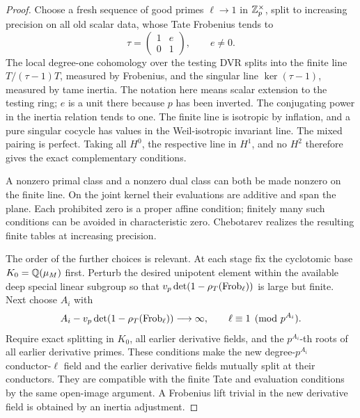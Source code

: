 \begin{proof}
Choose a fresh sequence of good primes \(\ell\to1\) in
\(\mathbb Z_p^\times\), split to increasing precision on all old scalar
data, whose Tate Frobenius tends to
\[
 \tau=\begin{pmatrix}1&e\\0&1\end{pmatrix},\qquad e\ne0.
\]
The local degree-one cohomology over the testing DVR splits into
the finite line \(T/(\tau-1)T\), measured by Frobenius, and the
singular line \(\ker(\tau-1)\), measured by tame inertia.
The notation here means scalar extension to the testing ring;
\(e\) is a unit there because \(p\) has been inverted.  The
conjugating power in the inertia relation tends to one.  The
finite line is isotropic by inflation, and a pure singular cocycle
has values in the Weil-isotropic invariant line.  The mixed pairing
is perfect.  Taking all \(H^0\), the respective line in \(H^1\),
and no \(H^2\) therefore gives the exact complementary conditions.

A nonzero primal class and a nonzero dual class can both be made
nonzero on the finite line.  On the joint kernel their evaluations
are additive and span the plane.  Each prohibited zero is a proper
affine condition; finitely many such conditions can be avoided in
characteristic zero.  Chebotarev realizes the resulting finite
tables at increasing precision.

The order of the further choices is relevant.  At each stage fix
the cyclotomic base \(K_0=\mathbb Q(\mu_M)\) first.  Perturb the desired
unipotent element within the available deep special linear
subgroup so that
\(v_p\det(1-\rho_T(\operatorname{Frob}_\ell))\) is large but finite.  Next
choose \(A_i\) with
\[
 A_i-v_p\det(1-\rho_T(\operatorname{Frob}_\ell))\longrightarrow\infty,
 \qquad \ell\equiv1\pmod{p^{A_i}}.
\]
Require exact splitting in \(K_0\), all earlier derivative fields,
and the \(p^{A_i}\)-th roots of all earlier derivative primes.
These conditions make the new degree-\(p^{A_i}\) conductor-\(\ell\)
field and the earlier derivative fields mutually split at their
conductors.  They are compatible with the finite Tate and
evaluation conditions by the same open-image argument.  A
Frobenius lift trivial in the new derivative field is obtained by
an inertia adjustment.


\end{proof}
